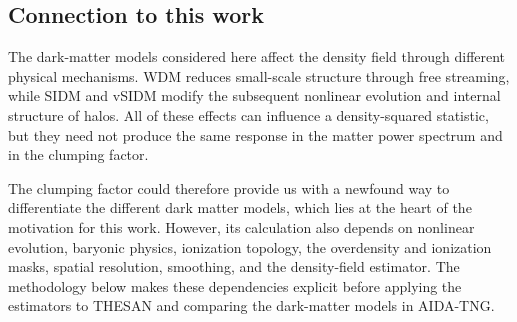 \subsection{Connection to this work}

The dark-matter models considered here affect the density field through different physical mechanisms. WDM reduces small-scale structure through free streaming, while SIDM and vSIDM modify the subsequent nonlinear evolution and internal structure of halos. All of these effects can influence a density-squared statistic, but they need not produce the same response in the matter power spectrum and in the clumping factor.

The clumping factor could therefore provide us with a newfound way to differentiate the different dark matter models, which lies at the heart of the motivation for this work. However, its calculation also depends on nonlinear evolution, baryonic physics, ionization topology, the overdensity and ionization masks, spatial resolution, smoothing, and the density-field estimator. The methodology below makes these dependencies explicit before applying the estimators to THESAN and comparing the dark-matter models in AIDA-TNG.
